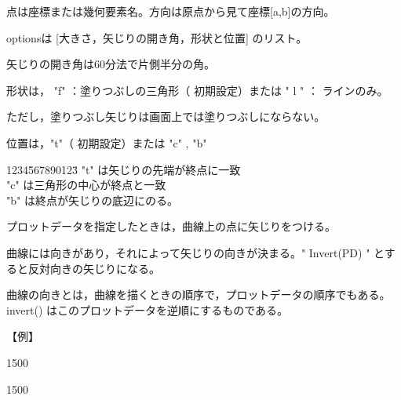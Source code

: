 \documentclass[papersize,a4paper,12pt,uplatex]{jsarticle}
\begin{document}
\begin{description}
点は座標または幾何要素名。方向は原点から見て座標[a,b]の方向。

optionsは [大きさ，矢じりの開き角，形状と位置] のリスト。

矢じりの開き角は60分法で片側半分の角。

形状は， "f" ：塗りつぶしの三角形（ 初期設定）または  " l " ： ラインのみ。

ただし，塗りつぶし矢じりは画面上では塗りつぶしにならない。 

位置は，"t"（ 初期設定）または "c" , "b"
\begin{tabbing}
1234\=567890123\=\kill
    \>"t" は矢じりの先端が終点に一致\\
    \>"c" は三角形の中心が終点と一致\\
    \>"b" は終点が矢じりの底辺にのる。
\end{tabbing}
プロットデータを指定したときは，曲線上の点に矢じりをつける。

曲線には向きがあり，それによって矢じりの向きが決まる。" Invert(PD) " とすると反対向きの矢じりになる。

曲線の向きとは，曲線を描くときの順序で，プロットデータの順序でもある。invert() はこのプロットデータを逆順にするものである。

\vspace{\baselineskip}

【例】

\vspace{\baselineskip}
\begin{layer}{150}{0}
\end{layer}

\vspace{75mm}
\begin{layer}{150}{0}
\end{layer}


\end{description}
\end{document}
